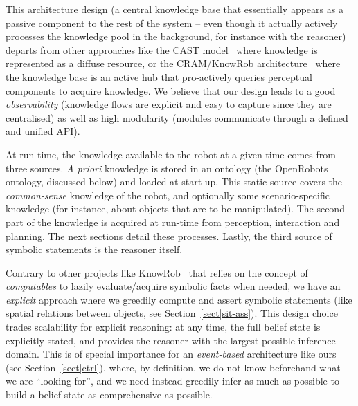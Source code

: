 \documentclass[preprint,3p,times]{elsarticle}
\begin{document}
This architecture design (a central knowledge base that essentially appears as a
passive component to the rest of the system -- even though it actually actively
processes the knowledge pool in the background, for instance with the reasoner)
departs from other approaches like the CAST model~\cite{Hawes2007} where
knowledge is represented as a diffuse resource, or the CRAM/KnowRob
architecture~\cite{Beetz2010} where the knowledge base is an active hub that
pro-actively queries perceptual components to acquire knowledge. We believe that
our design leads to a good \emph{observability} (knowledge flows are explicit
and easy to capture since they are centralised) as well as high modularity
(modules communicate through a defined and unified API).

At run-time, the knowledge available to the robot at a given time comes from
three sources. {\it A priori} knowledge is stored in an ontology (the {\sc
OpenRobots} ontology, discussed below) and loaded at start-up. This static source covers the
\emph{common-sense} knowledge of the robot, and optionally some
scenario-specific knowledge (for instance, about objects that are to be
manipulated). The second part of the knowledge is acquired at run-time from
perception, interaction and planning. The next sections detail these processes.
Lastly, the third source of symbolic statements is the reasoner itself.

Contrary to other projects like KnowRob~\cite{Tenorth2009a} that relies on
the concept of \emph{computables} to lazily evaluate/acquire symbolic facts when
needed, we have an \emph{explicit} approach where we greedily compute and assert
symbolic statements (like spatial relations between objects, see
Section~\ref{sect|sit-ass}). This design choice trades scalability for explicit
reasoning: at any time, the full belief state is explicitly stated, and
provides the reasoner with the largest possible inference domain. This is of
special importance for an \emph{event-based} architecture like ours (see
Section~\ref{sect|ctrl}), where, by definition, we do not know beforehand what
we are ``looking for'', and we need instead greedily infer as much as possible
to build a belief state as comprehensive as possible.
\end{document}

